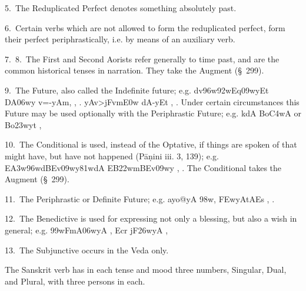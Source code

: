 5.~The Reduplicated Perfect denotes something absolutely past.

6.~Certain verbs which are not allowed to form the reduplicated perfect,
form their perfect periphrastically, i.e. by means of an auxiliary verb.

7.~8.~The First and Second Aorists refer generally to time past, and are
the common historical tenses in narration. They take the Augment
(\S~299).

9.~The Future, also called the Indefinite future; e.g.
{\dn d\?v\396w\?\392wEq\0\309wyEt DA\306wy\2 v=-yAm,} , .
{\dn yAv>jFvm\3E0w\2 dA-yEt} , . Under certain circumstances
this Future may be used optionally with the Periphrastic Future; e.g.
{\dn kdA Bo\3C4wA}  or {\dn Bo\323wyt\?} ,

10.~The Conditional is used, instead of the Optative, if things are
spoken of that might have, but have not happened (Pāṇini iii. 3, 139);
e.g. {\dn {}E\3A3w\396w\?dBEv\309wy\381wdA EB\322wmBEv\309wy}
, . The Conditional
takes the Augment (\S~299).

11.~The Periphrastic or Definite Future; e.g. {\dn ayo@yA\2 \398w,
\3FEwyAtAEs} , .

12.~The Benedictive is used for expressing not only a blessing, but also
a wish in general; e.g. {\dn \399wFmA\306wyA} ,
 {\dn Ecr\2 jF\326wyA} , 

13.~The Subjunctive occurs in the Veda only.

\s The Sanskrit verb has in each tense and mood three numbers, Singular,
Dual, and Plural, with three persons in each.